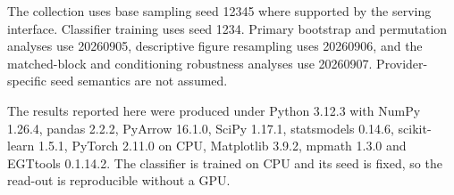 \documentclass[11pt,a4paper]{article}
\begin{document}
The collection uses base sampling seed 12345 where supported by the serving
interface. Classifier training uses seed 1234. Primary bootstrap and permutation
analyses use 20260905, descriptive figure resampling uses 20260906, and the
matched-block and conditioning robustness analyses use 20260907. Provider-specific
seed semantics are not assumed.

The results reported here were produced under Python 3.12.3 with NumPy 1.26.4,
pandas 2.2.2, PyArrow 16.1.0, SciPy 1.17.1, statsmodels 0.14.6,
scikit-learn 1.5.1, PyTorch 2.11.0 on CPU, Matplotlib 3.9.2, mpmath 1.3.0 and
EGTtools 0.1.14.2. The classifier is trained on CPU and its seed is fixed, so
the read-out is reproducible without a GPU.




\end{document}
